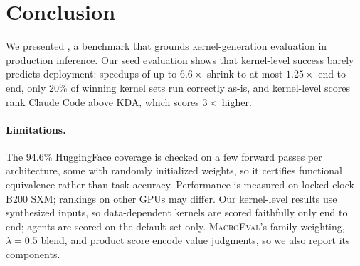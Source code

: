 \section{Conclusion}
\label{sec:conclusion}

We presented \fastkernels{}, a benchmark that grounds kernel-generation evaluation in production inference.
Our seed evaluation shows that kernel-level success barely predicts deployment: speedups of up to $6.6\times$ shrink to at most $1.25\times$ end to end, only 20\% of winning kernel sets run correctly as-is, and kernel-level scores rank Claude Code above KDA, which scores $3\times$ higher.

\paragraph{Limitations.}
The $94.6\%$ HuggingFace coverage is checked on a few forward passes per architecture, some with randomly initialized weights, so it certifies functional equivalence rather than task accuracy.
Performance is measured on locked-clock B200 SXM; rankings on other GPUs may differ.
Our kernel-level results use synthesized inputs, so data-dependent kernels are scored faithfully only end to end; agents are scored on the default set only.
\textsc{MacroEval}'s family weighting, $\lambda{=}0.5$ blend, and product score encode value judgments, so we also report its components.

